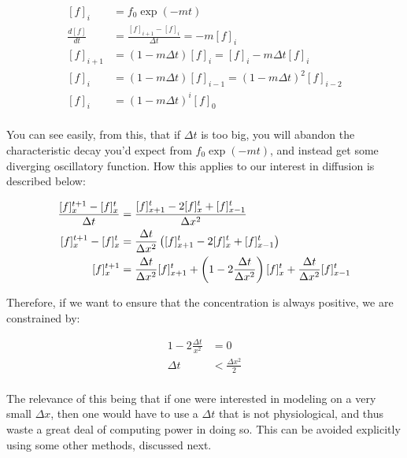 \begin{equation} \label{diff2}
\begin{split}
[f]_i & = f_0\exp(-mt) \\
\frac{d[f]}{dt} & = \frac{[f]_{i+1} - [f]_{i}}{\Delta t} = -m[f]_i \\
[f]_{i+1} & = (1-m\Delta t)[f]_i = [f]_i - m\Delta t [f]_i \\
[f]_{i} & = (1-m\Delta t)[f]_{i-1} = (1-m\Delta t)^2[f]_{i-2} \\
[f]_{i} & = (1-m\Delta t)^i[f]_{0} \\
\end{split}
\end{equation}

You can see easily, from this, that if $\Delta t$ is too big, you will abandon the characteristic decay you'd expect from $f_0\exp(-mt)$, and instead get some diverging oscillatory function. How this applies to our interest in diffusion is described below: 

\begin{equation} \label{diff3}
\begin{split}
\frac{[f]^{t+1}_{x} - [f]^{t}_{x}}{\Delta t} &= \frac{[f]^{t}_{x+1} - 2[f]^{t}_x + [f]^{t}_{x - 1}}{\Delta x^2}\\
[f]^{t+1}_{x} - [f]^{t}_{x} &= \frac{\Delta t}{\Delta x^2} \left([f]^{t}_{x+1} - 2[f]^{t}_x + [f]^{t}_{x - 1}\right) \\
[f]^{t+1}_{x} &= \frac{\Delta t}{\Delta x^2} [f]^{t}_{x+1} + \left(1 - 2\frac{\Delta t}{\Delta x^2}\right)[f]^{t}_x + \frac{\Delta t}{\Delta x^2}[f]^{t}_{x - 1} \\
\end{split}
\end{equation}

Therefore, if we want to ensure that the concentration is always positive, we are constrained by: 

\begin{equation} \label{diff4}
\begin{split}
1 - 2\frac{\Delta t}{x^2} & = 0\\
\Delta t & < \frac{\Delta x^2}{2}\\
\end{split}
\end{equation}

The relevance of this being that if one were interested in modeling on a very small $\Delta x$, then one would have to use a $\Delta t$ that is not physiological, and thus waste a great deal of computing power in doing so. This can be avoided explicitly using some other methods, discussed next. 

